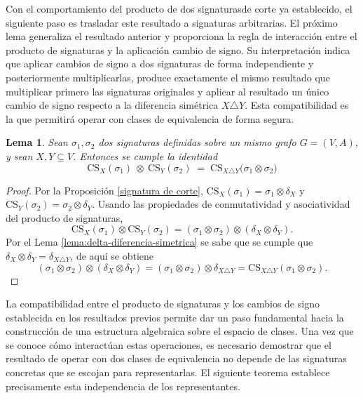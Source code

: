 \documentclass[11pt,a4paper,spanish]{report}
\theoremstyle{plain}
\newtheorem{lema}[teorema]{Lema}
\begin{document}
Con el comportamiento del producto de dos signaturasde corte ya establecido, el siguiente paso es trasladar este resultado a signaturas arbitrarias. El próximo lema generaliza el resultado anterior y proporciona la regla de interacción entre el producto de signaturas y la aplicación cambio de signo. Su interpretación indica que aplicar cambios de signo a dos signaturas de forma independiente y posteriormente multiplicarlas, produce exactamente el mismo resultado que multiplicar primero las signaturas originales y aplicar al resultado un único cambio de signo respecto a la diferencia simétrica $X \triangle Y$. Esta compatibilidad es la que permitirá operar con clases de equivalencia de forma segura.



\begin{lema}\label{3.8}
Sean $\sigma_1, \sigma_2$ dos signaturas definidas sobre un mismo grafo $G=(V,A)$, y sean $X,Y \subseteq V$. Entonces se cumple la identidad
\[
\mathrm{CS}_X(\sigma_1)\ \otimes\ \mathrm{CS}_Y(\sigma_2)
\;=\;
\mathrm{CS}_{X\triangle Y}\big(\sigma_1\otimes\sigma_2\big)
\]

\end{lema}

\begin{proof}
Por la Proposición \ref{signatura de corte}, $\mathrm{CS}_X(\sigma_1) = \sigma_1 \otimes \delta_X$ y $\mathrm{CS}_Y(\sigma_2) = \sigma_2 \otimes \delta_Y$.  
Usando las propiedades de conmutatividad y asociatividad del producto de signaturas,
\[
\mathrm{CS}_X(\sigma_1)\otimes\mathrm{CS}_Y(\sigma_2)
=(\sigma_1\otimes\sigma_2)\otimes(\delta_X\otimes\delta_Y).
\]
Por el Lema \ref{lema:delta-diferencia-simetrica} se sabe que se cumple que
$\delta_X\otimes\delta_Y = \delta_{X\triangle Y}$, de aquí 
se obtiene
\[
(\sigma_1\otimes\sigma_2)\otimes(\delta_X\otimes\delta_Y)
=(\sigma_1\otimes\sigma_2)\otimes\delta_{X\triangle Y}
=\mathrm{CS}_{X\triangle Y}(\sigma_1\otimes\sigma_2).
\]
\end{proof}

La compatibilidad entre el producto de signaturas y los cambios de signo establecida en los resultados previos permite dar un paso fundamental hacia la construcción de una estructura algebraica sobre el espacio de clases. Una vez que se conoce cómo interactúan estas operaciones, es necesario demostrar que el resultado de operar con dos clases de equivalencia no depende de las signaturas concretas que se escojan para representarlas. El siguiente teorema establece precisamente esta independencia de los representantes.
\end{document}
